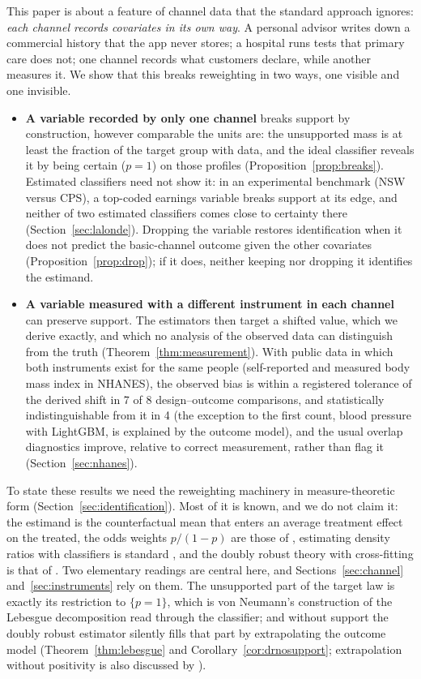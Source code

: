 \documentclass[11pt,a4paper]{article}
\theoremstyle{plain}
\theoremstyle{definition}
\begin{document}
This paper is about a feature of channel data that the standard approach ignores: \emph{each channel records covariates in its own way}. A personal advisor writes down a commercial history that the app never stores; a hospital runs tests that primary care does not; one channel records what customers declare, while another measures it. We show that this breaks reweighting in two ways, one visible and one invisible.
\begin{itemize}
  \item \textbf{A variable recorded by only one channel} breaks support by construction, however comparable the units are: the unsupported mass is at least the fraction of the target group with data, and the ideal classifier reveals it by being certain ($p=1$) on those profiles (Proposition~\ref{prop:breaks}). Estimated classifiers need not show it: in an experimental benchmark (NSW versus CPS), a top-coded earnings variable breaks support at its edge, and neither of two estimated classifiers comes close to certainty there (Section~\ref{sec:lalonde}). Dropping the variable restores identification when it does not predict the basic-channel outcome given the other covariates (Proposition~\ref{prop:drop}); if it does, neither keeping nor dropping it identifies the estimand.
  \item \textbf{A variable measured with a different instrument in each channel} can preserve support. The estimators then target a shifted value, which we derive exactly, and which no analysis of the observed data can distinguish from the truth (Theorem~\ref{thm:measurement}). With public data in which both instruments exist for the same people (self-reported and measured body mass index in NHANES), the observed bias is within a registered tolerance of the derived shift in 7 of 8 design--outcome comparisons, and statistically indistinguishable from it in 4 (the exception to the first count, blood pressure with LightGBM, is explained by the outcome model), and the usual overlap diagnostics improve, relative to correct measurement, rather than flag it (Section~\ref{sec:nhanes}).
\end{itemize}

To state these results we need the reweighting machinery in measure-theoretic form (Section~\ref{sec:identification}). Most of it is known, and we do not claim it: the estimand is the counterfactual mean that enters an average treatment effect on the treated, the odds weights $p/(1-p)$ are those of \citet{hirano2003}, estimating density ratios with classifiers is standard \citep{qin1998,bickel2009,sugiyama2012}, and the doubly robust theory with cross-fitting is that of \citet{chernozhukov2018}. Two elementary readings are central here, and Sections~\ref{sec:channel} and~\ref{sec:instruments} rely on them. The unsupported part of the target law is exactly its restriction to $\{p=1\}$, which is von Neumann's construction of the Lebesgue decomposition \citep[Theorem 6.10]{rudin1987} read through the classifier; and without support the doubly robust estimator silently fills that part by extrapolating the outcome model (Theorem~\ref{thm:lebesgue} and Corollary~\ref{cor:drnosupport}; extrapolation without positivity is also discussed by \citet{petersen2012}).
\end{document}
